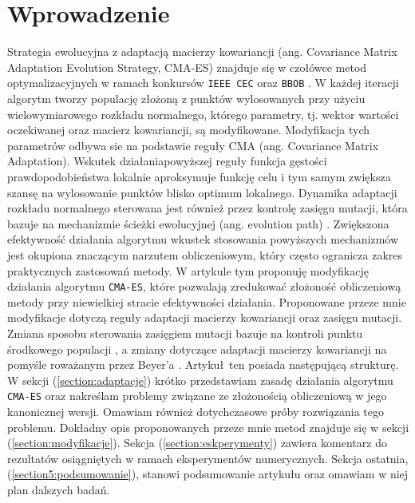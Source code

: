 \section{Wprowadzenie}
\label{section:wprowadzenie}
Strategia ewolucyjna z adaptacją macierzy kowariancji (ang. Covariance Matrix Adaptation Evolution Strategy, CMA-ES) \cite{cmaes} znajduje się w czołówce metod optymalizacyjnych w ramach konkursów \texttt{IEEE CEC} \cite{cec2017} oraz \texttt{BBOB} \cite{HansenEtal10}. W każdej iteracji algorytm tworzy populację złożoną z punktów wylosowanych przy użyciu wielowymiarowego rozkładu normalnego, którego parametry, tj. wektor wartości oczekiwanej oraz macierz kowariancji, są modyfikowane. Modyfikacja tych parametrów odbywa sie na podstawie reguły CMA (ang. Covariance Matrix Adaptation). Wskutek działaniapowyższej reguły funkcja gęstości prawdopodobieństwa lokalnie aproksymuje funkcję celu i tym samym zwiększa szansę na wylosowanie punktów blisko optimum lokalnego. Dynamika adaptacji rozkładu normalnego sterowana jest również przez kontrolę zasięgu mutacji, która bazuje na mechanizmie ścieżki ewolucyjnej (ang. evolution path) \cite{Hansen2001}. Zwiększona efektywność działania algorytmu wkustek stosowania powyższych mechanizmów jest okupiona znaczącym narzutem obliczeniowym, który często ogranicza zakres praktycznych zastosowań metody.
W artykule tym proponuję modyfikację działania algorytmu \texttt{CMA-ES}, które pozwalają zredukować złożoność obliczeniową metody przy niewielkiej stracie efektywności działania. Proponowane przeze mnie modyfikacje dotyczą reguły adaptacji macierzy kowariancji oraz zasięgu mutacji. Zmiana sposobu sterowania zasięgiem mutacji bazuje na kontroli punktu środkowego populacji \cite{Arabas17}, a zmiany dotyczące adaptacji macierzy kowariancji na pomyśle roważanym przez Beyer'a \cite{SMAES}.
Artykuł ten posiada następującą strukturę. W sekcji (\ref{section:adaptacje}) krótko przedstawiam zasadę działania algorytmu \texttt{CMA-ES} oraz nakreślam problemy związane ze złożonością obliczeniową w jego kanonicznej wersji. Omawiam również dotychczasowe próby rozwiązania tego problemu. Dokładny opis proponowanych przeze mnie metod znajduje się w sekcji (\ref{section:modyfikacje}). Sekcja (\ref{section:eskperymenty}) zawiera komentarz do rezultatów osiągniętych w ramach eksperymentów numerycznych. Sekcja ostatnia, (\ref{section5:podsumowanie}), stanowi podsumowanie artykułu oraz omawiam w niej plan dalszych badań.
